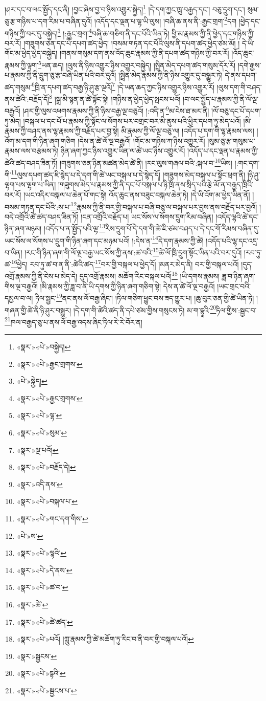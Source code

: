 །ཤར་དང་བ་ལང་སྤྱོད་དང་ནི། །བྱང་ཞེས་བྱ་བ་ཉིས་འགྱུར་སྐྱེད།\footnote{«སྣར་»«པེ་»བསྐྱེད།} །དེ་དག་ཀྱང་ཁྲུ་བརྒྱད་དང་། བཅུ་དྲུག་དང་། སུམ་ཅུ་རྩ་གཉིས་པ་དག་རིམ་པ་བཞིན་དུའོ། །འདོད་དང་ལྡན་པ་ལྷ་ཡི་ལུས། །བཞི་ཆ་ནས་ནི་:རྒྱང་གྲག་\footnote{«སྣར་»«པེ་»རྒྱང་གྲགས་}དག །ཕྱེད་དང་གཉིས་ཀྱི་བར་དུ་བསྐྱེད།\footnote{«པེ་»སྐྱེད།} །:རྒྱང་གྲག་\footnote{«སྣར་»«པེ་»རྒྱང་གྲགས་}བཞི་ཆ་གཅིག་ནི་དང་པོའི་ཡིན་ཏེ། ཕྱི་མ་རྣམས་ཀྱི་ནི་ཕྱེད་དང་གཉིས་ཀྱི་བར་རོ། །གཟུགས་ཅན་དང་པོ་དཔག་ཚད་ཕྱེད། །བསམ་གཏན་དང་པོའི་ལུས་ནི་དཔག་ཚད་ཕྱེད་ཙམ་མོ། །
དེ་ཡི་གོང་མ་ཕྱེད་ཕྱེད་བསྐྱེད། །གནས་གསུམ་དག་ནས་འོད་ཆུང་རྣམས་ཀྱི་ནི་དཔག་ཚད་གཉིས་ཀྱི་བར་རོ། །འོད་ཆུང་རྣམས་ཀྱི་ལྟག་\footnote{«སྣར་»«པེ་»ལྷ་}ཡན་ཆད། །ལུས་ནི་ཉིས་འགྱུར་ཉིས་འགྱུར་བསྐྱེད། །སྤྲིན་མེད་དཔག་ཚད་གསུམ་དོར་རོ། །དགེ་རྒྱས་པ་རྣམས་ཀྱི་ནི་དྲུག་ཅུ་རྩ་བཞི་ཡིན་པའི་བར་དུའོ། །སྤྲིན་མེད་རྣམས་ཀྱི་ནི་ཉིས་འགྱུར་དུ་བསྒྱུར་ཏེ། དེ་ནས་དཔག་ཚད་གསུམ་\footnote{«སྣར་»«པེ་»སུམ་}ཁྲི་ན་དཔག་ཚད་བརྒྱ་ཉི་ཤུ་རྩ་ལྔའོ།\footnote{«སྣར་»ལྔ་པའོ།} །དེ་ཡན་ཆད་ཀྱང་ཉིས་འགྱུར་ཉིས་འགྱུར་རོ། །ལུས་དག་གི་བཤད་ནས་ཚེའི་:བརྗོད་དོ།\footnote{«སྣར་»«པེ་»བརྗོད་དེ།} །སྒྲ་མི་སྙན་ན་ཚེ་སྟོང་སྟེ། །གཉིས་ན་ཕྱེད་ཕྱེད་སྤངས་པའོ། །བ་ལང་སྤྱོད་པ་རྣམས་ཀྱི་ནི་ལོ་ལྔ་བརྒྱའོ། །ཤར་གྱི་ལུས་འཕགས་རྣམས་ཀྱི་ནི་ཉིས་བརྒྱ་ལྔ་བཅུའོ། །:འདི་ན་\footnote{«སྣར་»འདི་ནས་}མ་ངེས་ཐ་མར་ནི། །ལོ་བཅུ་དང་པོ་དཔག་ཏུ་མེད། །བསྐལ་པ་དང་པོ་པ་རྣམས་ཀྱི་སྟོང་ལ་སོགས་པར་བགྲང་བར་མི་ནུས་པའི་ཕྱིར་དཔག་ཏུ་མེད་པའོ། །མི་རྣམས་ཀྱི་བཤད་ནས་ལྷ་རྣམས་ཀྱི་བརྗོད་པར་བྱ་སྟེ། མི་རྣམས་ཀྱི་ལོ་ལྔ་བཅུ་ལ། །འདོད་པ་དག་གི་ལྷ་རྣམས་ལས། །འོག་མ་དག་གི་ཉིན་ཞག་གཅིག །དེས་ན་ཚེ་ལོ་ལྔ་བརྒྱའོ། །གོང་མ་གཉིས་ཀ་ཉིས་འགྱུར་རོ། །སུམ་ཅུ་རྩ་གསུམ་པ་རྣམས་ལས་བརྩམས་ཏེ། ཉིན་ཞག་ཀྱང་ཉིས་འགྱུར་ཡིན་ལ་ཚེ་ཡང་ཉིས་འགྱུར་རོ། །འདོད་པ་དང་ལྡན་པ་རྣམས་ཀྱི་ཚེའི་ཚད་བཤད་ཟིན་ཏོ། །གཟུགས་ཅན་ཉིན་མཚན་མེད་ཚེ་ནི། །རང་ལུས་གཞལ་བའི་:སྐལ་བ་\footnote{«སྣར་»«པེ་»བསྐལ་པ་}ཡིས། །:གང་དག་གི་\footnote{«སྣར་»«པེ་»གང་དག་གིས་}ལུས་དཔག་ཚད་ཇི་སྙེད་པ་དེ་དག་གི་ཚེ་ཡང་བསྐལ་པ་དེ་སྙེད་དོ། །གཟུགས་མེད་བསྐལ་པ་སྟོང་ཕྲག་ནི། །ཉི་ཤུ་ལྷག་པས་ལྷག་པ་ཡིན། །གཟུགས་མེད་པ་རྣམས་ཀྱི་ནི་དང་པོ་བསྐལ་པ་ཉི་ཁྲི་ནས་སྲིད་པའི་རྩེ་མོ་ན་བརྒྱད་ཁྲིའི་བར་རོ། །ཡང་འདིར་བསྐལ་པ་ཆེན་པོ་གང་སྟེ། འོད་ཆུང་ནས་བཟུང་བསྐལ་ཆེན་ཏེ། །དེ་ཡི་འོག་མ་ཕྱེད་ཡིན་ནོ། །བསམ་གཏན་དང་པོའི་:ས་པ་\footnote{«པེ་»ས་}རྣམས་ཀྱི་ནི་བར་གྱི་བསྐལ་པ་བཞི་བཅུ་ལ་བསྐལ་པར་བྱས་ནས་བརྗོད་པར་བྱའོ། །བདེ་འགྲོའི་ཚེ་ཚད་བཤད་ཟིན་ཏོ། །ངན་འགྲོའི་བརྗོད་པ། ཡང་སོས་ལ་སོགས་དྲུག་རིམ་བཞིན། །འདོད་ལྷའི་ཚེ་དང་ཉིན་ཞག་མཉམ། །འདོད་པ་ན་སྤྱོད་པའི་ལྷ་\footnote{«སྣར་»«པེ་»ལྷའི་}རིས་དྲུག་པོ་དེ་དག་གི་ཚེ་ཇི་ཙམ་བཤད་པ་དེ་དང་གོ་རིམས་བཞིན་དུ་ཡང་སོས་ལ་སོགས་པ་དྲུག་གི་ཉིན་ཞག་དང་མཉམ་པའོ། །:དེས་ན་\footnote{«སྣར་»«པེ་»དེ་ནས་}དེ་དག་རྣམས་ཀྱི་ཚེ། །འདོད་པའི་ལྷ་དང་འདྲ་བ་ཡིན། །རང་གི་ཉིན་ཞག་གི་ལོ་ལྔ་བརྒྱ་ཡང་སོས་ཀྱི་ནས་:ཚ་བའི་\footnote{«སྣར་»«པེ་»ཚ་བ་}ཚེ་ལོ་ཁྲི་དྲུག་སྟོང་ཡིན་པའི་བར་དུའོ། །རབ་ཏུ་ཚ་\footnote{«སྣར་»ཚེ་}ཕྱེད། རབ་ཏུ་ཚ་བ་ན་ནི་:ཚེའི་ཚད་\footnote{«སྣར་»«པེ་»ཚེ་ཚད་}བར་གྱི་བསྐལ་པ་ཕྱེད་དོ། །མནར་མེད་ནི། བར་གྱི་བསྐལ་པའོ། །དུད་འགྲོ་རྣམས་ཀྱི་ནི་ངེས་པ་མེད་དེ། དུད་འགྲོ་རྣམས། མཆོག་རིང་བསྐལ་པའོ།\footnote{«སྣར་»«པེ་»པའོ། །ཀླུ་རྣམས་ཀྱི་ཚེ་མཆོག་ཏུ་རིང་བ་ནི་བར་གྱི་བསྐལ་པའོ།} །ཡི་དགས་རྣམས། ཟླ་བ་ཉིན་ཞག་གིས་ལྔ་བརྒྱའོ། །མི་རྣམས་ཀྱི་ཟླ་བ་ནི་ཡི་དགས་ཀྱི་ཉིན་ཞག་གཅིག་སྟེ། དེས་ན་ཚེ་ལོ་ལྔ་བརྒྱའོ། །ཡང་གྲང་བའི་དམྱལ་བ་ལ། ཏིལ་སྦྱང་\footnote{«སྣར་»སྦྱངས་}ནང་ནས་ལོ་བརྒྱ་ཞིང་། །ཏིལ་གཅིག་ཕྱུང་བས་ཟད་གྱུར་པ། །ཆུ་བུར་ཅན་གྱི་ཚེ་ཡིན་ཏེ། །གཞན་གྱི་ཚེ་ནི་ཉི་ཤུར་བསྒྱུར། །དེ་དག་གི་ཚེའི་ཚད་ནི་དཔེ་ཙམ་གྱིས་གསུངས་ཏེ། མ་ག་དྷཱའི་\footnote{«སྣར་»«པེ་»དྷའི་}ཏིལ་གྱིས་:སྦྱང་བ་\footnote{«སྣར་»«པེ་»སྦྱངས་པ་}ཁལ་བརྒྱད་ཅུ་པ་ནས་ལོ་བརྒྱ་འདས་ཞིང་ཏིལ་རེ་རེ་བོར་ན། 
